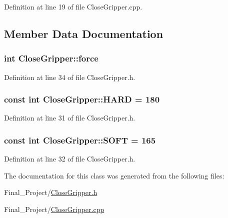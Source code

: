 Definition at line 19 of file Close\-Gripper.\-cpp.



\subsection{Member Data Documentation}
\hypertarget{classCloseGripper_ac90b3c4ad2ba86181bdfa5a3f926593c}{
\subsubsection[{force}]{\setlength{\rightskip}{0pt plus 5cm}int Close\-Gripper\-::force\hspace{0.3cm}{\ttfamily [private]}}}\label{classCloseGripper_ac90b3c4ad2ba86181bdfa5a3f926593c}


Definition at line 34 of file Close\-Gripper.\-h.

\hypertarget{classCloseGripper_af1d1dab59b0bddacb0e82e676e47797a}{
\subsubsection[{H\-A\-R\-D}]{\setlength{\rightskip}{0pt plus 5cm}const int Close\-Gripper\-::\-H\-A\-R\-D = 180\hspace{0.3cm}{\ttfamily [static]}}}\label{classCloseGripper_af1d1dab59b0bddacb0e82e676e47797a}


Definition at line 31 of file Close\-Gripper.\-h.

\hypertarget{classCloseGripper_a2b6cac5f41e2d57f180fdcf18aacae45}{
\subsubsection[{S\-O\-F\-T}]{\setlength{\rightskip}{0pt plus 5cm}const int Close\-Gripper\-::\-S\-O\-F\-T = 165\hspace{0.3cm}{\ttfamily [static]}}}\label{classCloseGripper_a2b6cac5f41e2d57f180fdcf18aacae45}


Definition at line 32 of file Close\-Gripper.\-h.



The documentation for this class was generated from the following files\-:\begin{DoxyCompactItemize}
\item 
Final\-\_\-\-Project/\hyperlink{CloseGripper_8h}{Close\-Gripper.\-h}\item 
Final\-\_\-\-Project/\hyperlink{CloseGripper_8cpp}{Close\-Gripper.\-cpp}\end{DoxyCompactItemize}
